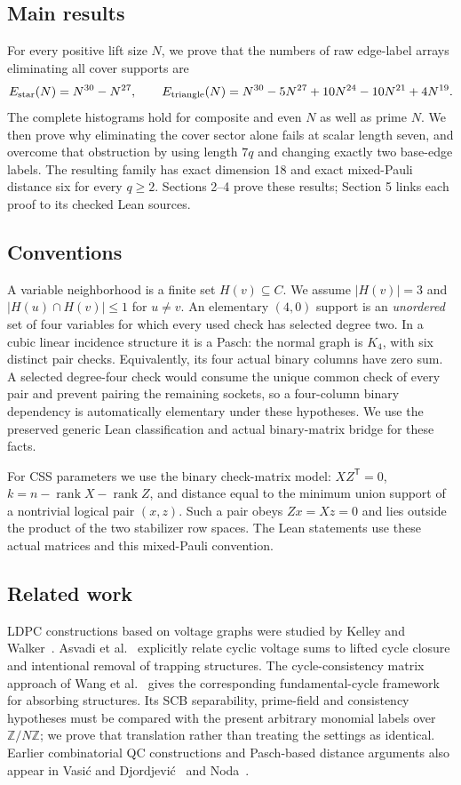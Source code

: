 \documentclass[11pt]{article}
\newcommand{\Z}{\mathbb Z}
\begin{document}
\subsection*{Main results}
For every positive lift size $N$, we prove that the numbers of raw edge-label
arrays eliminating all cover supports are
\[
 E_{\rm star}(N)=N^{30}-N^{27},\qquad
 E_{\rm triangle}(N)=N^{30}-5N^{27}+10N^{24}-10N^{21}+4N^{19}.
\]
The complete histograms hold for composite and even $N$ as well as prime $N$.
We then prove why eliminating the cover sector alone fails at scalar length
seven, and overcome that obstruction by using length $7q$ and changing exactly
two base-edge labels. The resulting family has exact dimension 18 and exact
mixed-Pauli distance six for every $q\geq2$. Sections 2--4 prove these results;
Section 5 links each proof to its checked Lean sources.

\subsection*{Conventions}

A variable neighborhood is a finite set $H(v)\subseteq C$. We assume
$|H(v)|=3$ and $|H(u)\cap H(v)|\leq1$ for $u\ne v$. An elementary $(4,0)$
support is an \emph{unordered} set of four variables for which every used
check has selected degree two. In a cubic linear incidence structure it is a
Pasch: the normal graph is $K_4$, with six distinct pair checks. Equivalently,
its four actual binary columns have zero sum. A selected degree-four check
would consume the unique common check of every pair and prevent pairing the
remaining sockets, so a four-column binary dependency is automatically
elementary under these hypotheses. We use the preserved generic Lean
classification and actual binary-matrix bridge for these facts.

For CSS parameters we use the binary check-matrix model: $XZ^{\mathsf T}=0$,
$k=n-\operatorname{rank}X-\operatorname{rank}Z$, and distance equal to the
minimum union support of a nontrivial logical pair $(x,z)$. Such a pair obeys
$Zx=Xz=0$ and lies outside the product of the two stabilizer row spaces.
The Lean statements use these actual matrices and this mixed-Pauli convention.

\subsection*{Related work}
LDPC constructions based on voltage graphs were studied by Kelley and
Walker~\cite{KW}. Asvadi et al.~\cite{ABA} explicitly relate cyclic
voltage sums to lifted cycle closure and intentional removal of trapping
structures. The cycle-consistency matrix approach of
Wang et al.~\cite{WDW11,WDW12} gives the corresponding fundamental-cycle
framework for absorbing structures. Its SCB separability, prime-field and
consistency hypotheses must be compared with the present arbitrary monomial
labels over $\Z/N\Z$; we prove that translation rather than treating the
settings as identical. Earlier combinatorial QC constructions and
Pasch-based distance arguments also appear in Vasi\'c and Djordjevi\'c~\cite{VD} and
Noda~\cite{Noda}.
\end{document}
